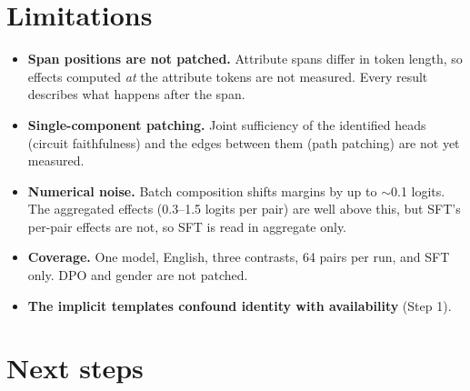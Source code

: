 \documentclass[11pt,a4paper]{article}
\begin{document}
\section{Limitations}
\begin{itemize}
  \item \textbf{Span positions are not patched.} Attribute spans differ in token length, so effects
        computed \emph{at} the attribute tokens are not measured. Every result describes what
        happens after the span.
  \item \textbf{Single-component patching.} Joint sufficiency of the identified heads (circuit
        faithfulness) and the edges between them (path patching) are not yet measured.
  \item \textbf{Numerical noise.} Batch composition shifts margins by up to $\sim$0.1 logits. The
        aggregated effects (0.3--1.5 logits per pair) are well above this, but SFT's per-pair
        effects are not, so SFT is read in aggregate only.
  \item \textbf{Coverage.} One model, English, three contrasts, 64 pairs per run, and SFT only. DPO
        and gender are not patched.
  \item \textbf{The implicit templates confound identity with availability} (Step 1).
\end{itemize}

\section{Next steps}
\label{sec:next}
\end{document}
